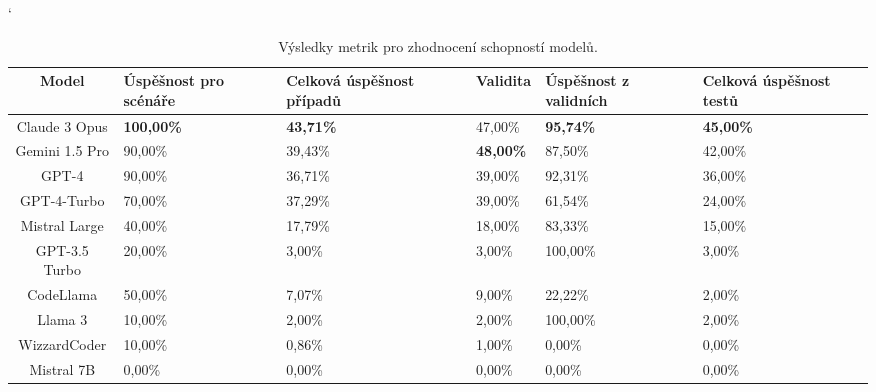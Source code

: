 \documentclass[czech, ma, kiv, he, iso690alph, pdf, viewonly]{fasthesis}
\begin{document}
        \begin{table}[H]
            \catcode`
            \begin{tabular}{|c|p{2cm}|p{2cm}|l|p{2cm}|p{2cm}|}
                \hline
                \textbf{Model} & \textbf{Úspěšnost pro \linebreak scénáře} & \textbf{Celková úspěšnost případů} & \textbf{Validita} & \textbf{Úspěšnost z validních} & \textbf{Celková úspěšnost testů} \\
                \hline
                \hline
                Claude 3 Opus & \textbf{100,00\%} & \textbf{43,71\%} & 47,00\% & \textbf{95,74\%} & \textbf{45,00\%} \\
                \hline
                Gemini 1.5 Pro & 90,00\% & 39,43\% & \textbf{48,00\%} & 87,50\% & 42,00\% \\
                \hline
                GPT-4         & 90,00\%  & 36,71\% & 39,00\% & 92,31\% & 36,00\% \\
                \hline
                GPT-4-Turbo   & 70,00\%  & 37,29\% & 39,00\% & 61,54\% & 24,00\% \\
                \hline
                Mistral Large & 40,00\%  & 17,79\% & 18,00\% & 83,33\% & 15,00\% \\
                \hline
                GPT-3.5 Turbo & 20,00\%  & 3,00\%  & 3,00\%  & 100,00\% & 3,00\% \\
                \hline
                CodeLlama     & 50,00\%  & 7,07\%  & 9,00\%  & 22,22\% & 2,00\% \\
                \hline
                Llama 3       & 10,00\%  & 2,00\%  & 2,00\%  & 100,00\% & 2,00\% \\
                \hline
                WizzardCoder  & 10,00\%  & 0,86\%  & 1,00\%  & 0,00\%  & 0,00\% \\
                \hline
                Mistral 7B    & 0,00\%   & 0,00\%  & 0,00\%  & 0,00\%  & 0,00\% \\
                \hline
            \end{tabular}
            \centering
            \caption{Výsledky metrik pro zhodnocení schopností modelů.}
            \label{tab:model_metrics}
        \end{table}
\end{document}
